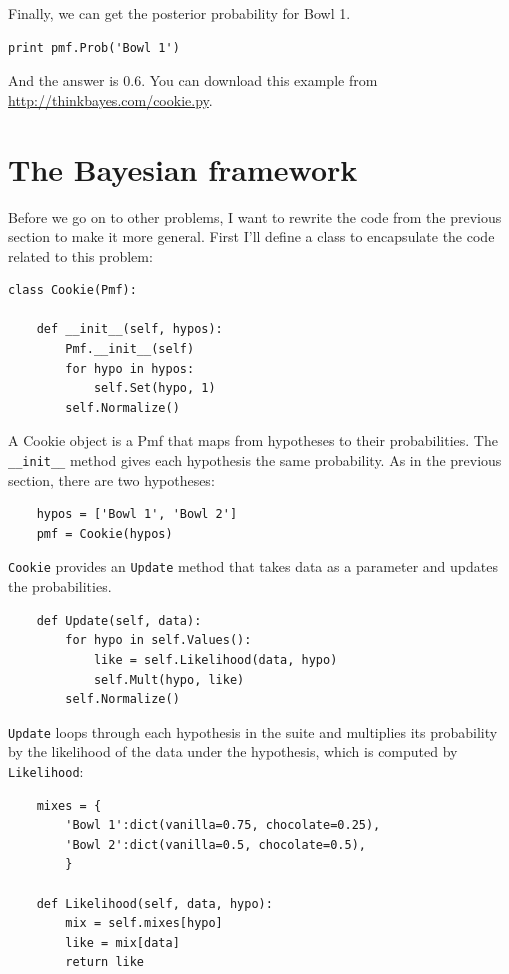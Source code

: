 \documentclass[12pt]{book}
\begin{document}
Finally, we can get the posterior probability for Bowl 1.

\begin{verbatim}
print pmf.Prob('Bowl 1')
\end{verbatim}

And the answer is 0.6.  You can download this example
from \url{http://thinkbayes.com/cookie.py}.


\section{The Bayesian framework}
\label{framework}

Before we go on to other problems, I want to rewrite the code
from the previous section to make it more general.  First I'll
define a class to encapsulate the code related to this problem:

\begin{verbatim}
class Cookie(Pmf):

    def __init__(self, hypos):
        Pmf.__init__(self)
        for hypo in hypos:
            self.Set(hypo, 1)
        self.Normalize()
\end{verbatim}

A Cookie object is a Pmf that maps from hypotheses to their
probabilities.  The \verb"__init__" method gives each hypothesis
the same probability.  As in the previous section, there are
two hypotheses:

\begin{verbatim}
    hypos = ['Bowl 1', 'Bowl 2']
    pmf = Cookie(hypos)
\end{verbatim}

\verb"Cookie" provides an \verb"Update" method that takes
data as a parameter and updates the probabilities.

\begin{verbatim}
    def Update(self, data):
        for hypo in self.Values():
            like = self.Likelihood(data, hypo)
            self.Mult(hypo, like)
        self.Normalize()
\end{verbatim}

\verb"Update" loops through each hypothesis in the suite
and multiplies its probability by the likelihood of the
data under the hypothesis, which is computed by \verb"Likelihood":

\begin{verbatim}
    mixes = {
        'Bowl 1':dict(vanilla=0.75, chocolate=0.25),
        'Bowl 2':dict(vanilla=0.5, chocolate=0.5),
        }

    def Likelihood(self, data, hypo):
        mix = self.mixes[hypo]
        like = mix[data]
        return like
\end{verbatim}
\end{document}
